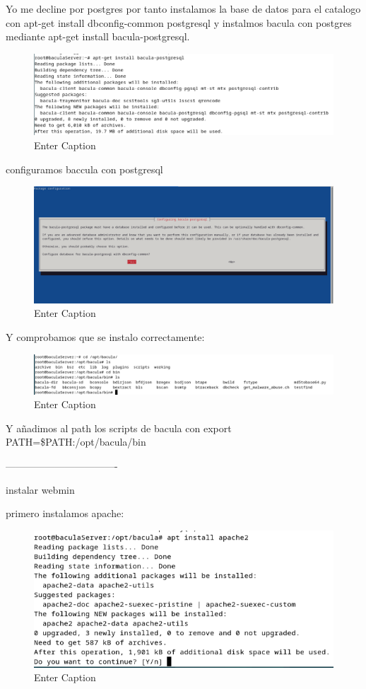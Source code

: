 Yo me decline por postgres por tanto instalamos la base de datos para el catalogo con apt-get install dbconfig-common postgresql y instalmos bacula con postgres mediante apt-get install bacula-postgresql.
\begin{figure}[H]
    \centering
    \includegraphics[width=0.5\linewidth]{instalacionBacula/baculapostgesql.png}
    \caption{Enter Caption}
\end{figure}


configuramos baccula con postgresql
\begin{figure}[H]
    \centering
    \includegraphics[width=0.5\linewidth]{instalacionBacula/configbaculapostgre.png}
    \caption{Enter Caption}
\end{figure}

Y comprobamos que se instalo correctamente:
\begin{figure}[H]
    \centering
    \includegraphics[width=0.5\linewidth]{instalacionBacula/baculadir.png}
    \caption{Enter Caption}
\end{figure}

Y añadimos al path los scripts de bacula con
export PATH=\$PATH:/opt/bacula/bin


\newpage
----------------------------------

instalar webmin


primero instalamos apache:

\begin{figure}[H]
    \centering
    \includegraphics[width=0.5\linewidth]{instalacionBacula/apache2.png}
    \caption{Enter Caption}
\end{figure}


